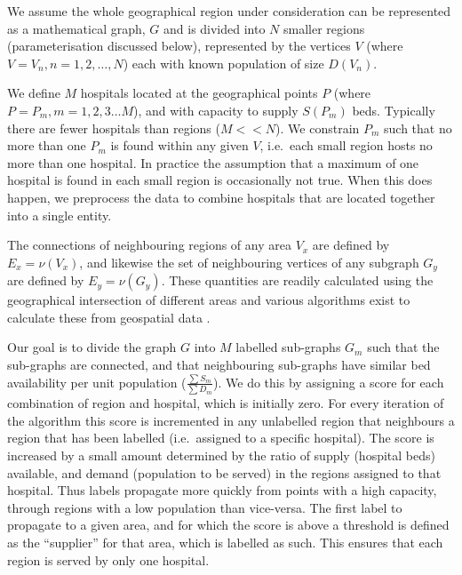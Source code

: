 \documentclass[twocolumn]{bmcart}%
\begin{document}
We assume the whole geographical region under consideration can be represented as a mathematical graph, \(G\) and is 
divided into \(N\) smaller regions (parameterisation discussed below), represented by the vertices \(V\) (where \(V=V_n, 
n = 1,2, \dots, N\)) each with known population of size \(D(V_n)\).

We define \(M\) hospitals located at the geographical points \(P\) (where \(P = P_m, m = 1,2,3 \dots M\)), and with 
capacity to supply \(S(P_m)\) beds. Typically there are fewer hospitals than regions (\(M<<N\)). We constrain \(P_m\) 
such that no more than one \(P_m\) is found within any given \(V\), i.e.~each small region hosts no more than one 
hospital. In practice the assumption that a maximum of one hospital is found in each small region is occasionally not 
true. When this does happen, we preprocess the data to combine hospitals that are located together into a single 
entity.

The connections of neighbouring regions of any area \(V_x\) are defined by \(E_x = \nu(V_x)\), and likewise the set of 
neighbouring vertices of any subgraph \(G_y\) are defined by \(E_y = \nu(G_y)\). These quantities are readily calculated 
using the geographical intersection of different areas and various algorithms exist to calculate these from geospatial 
data \cite{bivandRgeosInterfaceGeometry2020,pebesmaSimpleFeaturesStandardized2018}.


Our goal is to divide the graph \(G\) into \(M\) labelled sub-graphs \(G_m\) such that the sub-graphs are connected, and 
that neighbouring sub-graphs have similar bed availability per unit population (\(\frac{\sum S_m}{\sum D_m}\)). We do 
this by assigning a score for each combination of region and hospital, which is initially zero. For every iteration of 
the algorithm this score is incremented in any unlabelled region that neighbours a region that has been labelled 
(i.e.~assigned to a specific hospital). The score is increased by a small amount determined by the ratio of supply 
(hospital beds) available, and demand (population to be served) in the regions assigned to that hospital. Thus labels 
propagate more quickly from points with a high capacity, through regions with a low population than vice-versa. The 
first label to propagate to a given area, and for which the score is above a threshold is defined as the ``supplier'' 
for that area, which is labelled as such. This ensures that each region is served by only one hospital.
\end{document}
